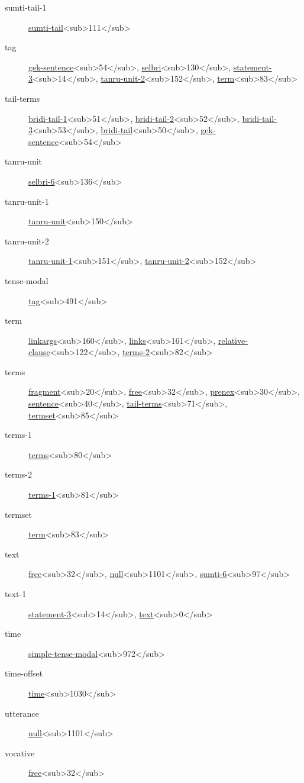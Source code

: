 \begin{description}
\item[sumti-tail-1] \hyperref[html:b111]{sumti-tail}<sub>111</sub>
\item[tag] \hyperref[html:b54]{gek-sentence}<sub>54</sub>, \hyperref[html:b130]{selbri}<sub>130</sub>, \hyperref[html:b14]{statement-3}<sub>14</sub>, \hyperref[html:b152]{tanru-unit-2}<sub>152</sub>, \hyperref[html:b83]{term}<sub>83</sub>
\item[tail-terms] \hyperref[html:b51]{bridi-tail-1}<sub>51</sub>, \hyperref[html:b52]{bridi-tail-2}<sub>52</sub>, \hyperref[html:b53]{bridi-tail-3}<sub>53</sub>, \hyperref[html:b50]{bridi-tail}<sub>50</sub>, \hyperref[html:b54]{gek-sentence}<sub>54</sub>
\item[tanru-unit] \hyperref[html:b136]{selbri-6}<sub>136</sub>
\item[tanru-unit-1] \hyperref[html:b150]{tanru-unit}<sub>150</sub>
\item[tanru-unit-2] \hyperref[html:b151]{tanru-unit-1}<sub>151</sub>, \hyperref[html:b152]{tanru-unit-2}<sub>152</sub>
\item[tense-modal] \hyperref[html:b491]{tag}<sub>491</sub>
\item[term] \hyperref[html:b160]{linkargs}<sub>160</sub>, \hyperref[html:b161]{links}<sub>161</sub>, \hyperref[html:b122]{relative-clause}<sub>122</sub>, \hyperref[html:b82]{terms-2}<sub>82</sub>
\item[terms] \hyperref[html:b20]{fragment}<sub>20</sub>, \hyperref[html:b32]{free}<sub>32</sub>, \hyperref[html:b30]{prenex}<sub>30</sub>, \hyperref[html:b40]{sentence}<sub>40</sub>, \hyperref[html:b71]{tail-terms}<sub>71</sub>, \hyperref[html:b85]{termset}<sub>85</sub>
\item[terms-1] \hyperref[html:b80]{terms}<sub>80</sub>
\item[terms-2] \hyperref[html:b81]{terms-1}<sub>81</sub>
\item[termset] \hyperref[html:b83]{term}<sub>83</sub>
\item[text] \hyperref[html:b32]{free}<sub>32</sub>, \hyperref[html:b1101]{null}<sub>1101</sub>, \hyperref[html:b97]{sumti-6}<sub>97</sub>
\item[text-1] \hyperref[html:b14]{statement-3}<sub>14</sub>, \hyperref[html:b0]{text}<sub>0</sub>
\item[time] \hyperref[html:b972]{simple-tense-modal}<sub>972</sub>
\item[time-offset] \hyperref[html:b1030]{time}<sub>1030</sub>
\item[utterance] \hyperref[html:b1101]{null}<sub>1101</sub>
\item[vocative] \hyperref[html:b32]{free}<sub>32</sub>
\end{description}

